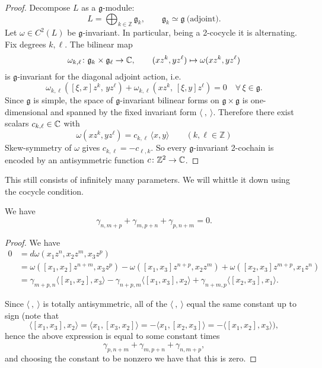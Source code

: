 \documentclass[12pt]{article}
\begin{document}
\begin{proof}
    Decompose $L$ as a $\mathfrak g$-module:
    \[
        L=\bigoplus_{k\in\mathbb Z}\mathfrak g_k,
        \qquad \mathfrak g_k\simeq \mathfrak g \ \text{(adjoint)}.
    \]
    Let $\omega\in C^2(L)$ be $\mathfrak g$-invariant. In particular, being a 2-cocycle it is alternating. Fix degrees $k,\ell$. The bilinear map
    \[
        \omega_{k,\ell}\colon \mathfrak g_k\times \mathfrak g_\ell\to\Bbb C,\qquad
        (x z^k, y z^\ell)\mapsto \omega(x z^k, y z^\ell)
    \]
    is $\mathfrak g$-invariant for the diagonal adjoint action, i.e.
    \[
        \omega_{k,\ell}([\xi,x]z^k,\,y z^\ell)+\omega_{k,\ell}(x z^k,\,[\xi,y]z^\ell)=0
        \quad \forall\,\xi\in\mathfrak g.
    \]
    Since $\mathfrak g$ is simple, the space of $\mathfrak g$-invariant bilinear forms on $\mathfrak g\times\mathfrak g$ is one-dimensional and spanned by the fixed invariant form $\langle\ ,\ \rangle$. Therefore there exist scalars $c_{k,\ell}\in\Bbb C$ with \[\omega(x z^k, y z^\ell)=c_{k,\ell}\,\langle x,y\rangle\qquad(k,\ell\in\mathbb{Z})\] Skew-symmetry of $\omega$ gives $c_{k,\ell}=-c_{\ell,k}$. So every $\mathfrak g$-invariant 2-cochain is encoded by an antisymmetric function
    $c\colon \mathbb Z^2\to\Bbb C$.
\end{proof}

This still consists of infinitely many parameters. We will whittle it down using the cocycle condition. 

\begin{proposition}
    We have
    \[
        \gamma_{n,m+p} + \gamma_{m,p+n} + \gamma_{p,n+m} = 0.
    \]
\end{proposition}

\begin{proof}
    We have
    \begin{align*}
        0 & = d\omega(x_1 z^n, x_2 z^m, x_3 z^p)            \\
          & = \omega([x_1,x_2]z^{n+m}, x_3 z^p)
        - \omega([x_1,x_3] z^{n+p}, x_2 z^m)
        + \omega([x_2,x_3] z^{m+p}, x_1 z^n)                \\
          & = \gamma_{m+p,n} \langle [x_1,x_2], x_3 \rangle
        - \gamma_{n+p,m} \langle [x_1,x_3], x_2 \rangle
        + \gamma_{n+m,p} \langle [x_2,x_3], x_1 \rangle.
    \end{align*}

    Since $\langle \ ,\ \rangle$ is totally antisymmetric, all of the $\langle \ ,\ \rangle$ equal the same constant up to sign (note that
    \[
        \langle [x_1,x_3], x_2\rangle = \langle x_1, [x_3,x_2]\rangle
        = -\langle x_1, [x_2,x_3]\rangle
        = -\langle [x_1,x_2], x_3\rangle),
    \]
    hence the above expression is equal to some constant times
    \[
        \gamma_{p,n+m} + \gamma_{m,p+n} + \gamma_{n,m+p},
    \]
    and choosing the constant to be nonzero we have that this is zero.
\end{proof}
\end{document}
